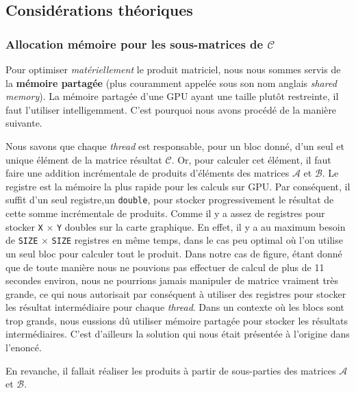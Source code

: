 \documentclass[	DIV=calc,%
							paper=a4,%
							fontsize=11pt%
							]{scrartcl}	 					%
\begin{document}
\subsection{Considérations théoriques}
\subsubsection{Allocation mémoire pour les sous-matrices de $\mathcal{C}$}
Pour optimiser \textit{matériellement }le produit matriciel, nous nous sommes servis de la \textbf{mémoire partagée} (plus couramment appelée sous son nom anglais \textit{shared memory}). La mémoire partagée d'une GPU ayant une taille plutôt restreinte, il faut l'utiliser intelligemment. C'est pourquoi nous avons procédé de la manière suivante.\par
Nous savons que chaque \textit{thread} est responsable, pour un bloc donné, d'un seul et unique élément de la matrice résultat $\mathcal{C}$. Or, pour calculer cet élément, il faut faire une addition incrémentale de produits d'éléments des matrices $\mathcal{A}$ et $\mathcal{B}$. Le registre est la mémoire la plus rapide pour les calculs sur GPU. Par conséquent, il suffit d'un seul registre,un \texttt{double}, pour stocker progressivement le résultat de cette somme incrémentale de produits. Comme il y a assez de registres pour stocker \texttt{X} $\times$ \texttt{Y} doubles sur la carte graphique. En effet, il y a au maximum besoin de \texttt{SIZE} $\times$ \texttt{SIZE} registres en même temps, dans le cas peu optimal où l'on utilise un seul bloc pour calculer tout le produit. Dans notre cas de figure, étant donné que de toute manière nous ne pouvions pas effectuer de calcul de plus de 11 secondes environ, nous ne pourrions jamais manipuler de matrice vraiment très grande, ce qui nous autorisait par conséquent à utiliser des registres pour stocker les résultat intermédiaire pour chaque \textit{thread}. Dans un contexte où les blocs sont trop grands, nous eussions dû utiliser mémoire partagée pour stocker les résultats intermédiaires. C'est d'ailleurs la solution qui nous était présentée à l'origine dans l'enoncé.\par
En revanche, il fallait réaliser les produits à partir de sous-parties des matrices $\mathcal{A}$ et $\mathcal{B}$. 
\end{document}
